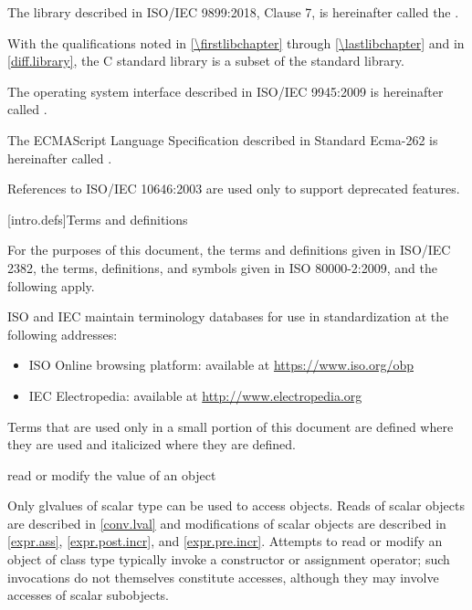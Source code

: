\pnum
The library described in ISO/IEC 9899:2018, Clause 7,
is hereinafter called the
.
\begin{footnote}
With the qualifications noted in \ref{\firstlibchapter}
through \ref{\lastlibchapter} and in \ref{diff.library}, the C standard
library is a subset of the \Cpp{} standard library.
\end{footnote}

\pnum
The operating system interface described in ISO/IEC 9945:2009 is
hereinafter called .

\pnum
The ECMAScript Language Specification described in Standard Ecma-262 is
hereinafter called .

\pnum
\begin{note}
References to ISO/IEC 10646:2003 are used only
to support deprecated features.
\end{note}

[intro.defs]{Terms and definitions}

\pnum
{}%
For the purposes of this document,
the terms and definitions
given in ISO/IEC 2382,
the terms, definitions, and symbols
given in ISO 80000-2:2009,
and the following apply.

\pnum
ISO and IEC maintain terminology databases
for use in standardization
at the following addresses:
\begin{itemize}
\item ISO Online browsing platform: available at \url{https://www.iso.org/obp}
\item IEC Electropedia: available at \url{http://www.electropedia.org}
\end{itemize}

\pnum
Terms that are used only in a small portion of this document
are defined where they are used and italicized where they are
defined.

%
read or modify the value of an object

\begin{defnote}
Only glvalues of scalar type can be used to access objects.
Reads of scalar objects are described in \ref{conv.lval} and
modifications of scalar objects are described in
\ref{expr.ass}, \ref{expr.post.incr}, and \ref{expr.pre.incr}.
Attempts to read or modify an object of class type
typically invoke a constructor
or assignment operator;
such invocations do not themselves constitute accesses,
although they may involve accesses of scalar subobjects.
\end{defnote}

